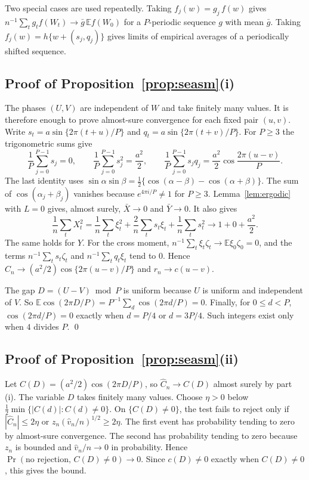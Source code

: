 \documentclass[11pt]{article}
\theoremstyle{remark}
\newcommand{\E}{\mathbb E}
\begin{document}
Two special cases are used repeatedly. Taking $f_j(w)=g_j\,f(w)$ gives $n^{-1}\sum_t g_t f(W_t)\to\bar g\,\E f(W_0)$ for a $P$-periodic sequence $g$ with mean $\bar g$. Taking $f_j(w)=h\{w+(s_j,q_j)\}$ gives limits of empirical averages of a periodically shifted sequence.

\subsection{Proof of Proposition~\ref{prop:seasm}(i)}
The phases $(U,V)$ are independent of $W$ and take finitely many values. It is therefore enough to prove almost-sure convergence for each fixed pair $(u,v)$. Write $s_t=a\sin\{2\pi(t+u)/P\}$ and $q_t=a\sin\{2\pi(t+v)/P\}$. For $P\ge3$ the trigonometric sums give
\[
\frac1P\sum_{j=0}^{P-1}s_j=0,\qquad\frac1P\sum_{j=0}^{P-1}s_j^2=\frac{a^2}2,\qquad\frac1P\sum_{j=0}^{P-1}s_jq_j=\frac{a^2}2\cos\frac{2\pi(u-v)}P.
\]
The last identity uses $\sin\alpha\sin\beta=\tfrac12\{\cos(\alpha-\beta)-\cos(\alpha+\beta)\}$. The sum of $\cos(\alpha_j+\beta_j)$ vanishes because $e^{4\pi i/P}\ne1$ for $P\ge3$. Lemma~\ref{lem:ergodic} with $L=0$ gives, almost surely, $\bar X\to0$ and $\bar Y\to0$. It also gives
\[
\frac1n\sum_tX_t^2=\frac1n\sum_t\xi_t^2+\frac2n\sum_ts_t\xi_t+\frac1n\sum_ts_t^2\to1+0+\frac{a^2}2.
\]
The same holds for $Y$. For the cross moment, $n^{-1}\sum_t\xi_t\zeta_t\to\E\xi_0\zeta_0=0$, and the terms $n^{-1}\sum_ts_t\zeta_t$ and $n^{-1}\sum_tq_t\xi_t$ tend to $0$. Hence $\hat C_n\to(a^2/2)\cos\{2\pi(u-v)/P\}$ and $r_n\to c(u-v)$.

The gap $D=(U-V)\bmod P$ is uniform because $U$ is uniform and independent of $V$. So $\E\cos(2\pi D/P)=P^{-1}\sum_d\cos(2\pi d/P)=0$. Finally, for $0\le d<P$, $\cos(2\pi d/P)=0$ exactly when $d=P/4$ or $d=3P/4$. Such integers exist only when $4$ divides $P$. \qed

\subsection{Proof of Proposition~\ref{prop:seasm}(ii)}
Let $C(D)=(a^2/2)\cos(2\pi D/P)$, so $\hat C_n\to C(D)$ almost surely by part (i). The variable $D$ takes finitely many values. Choose $\eta>0$ below $\tfrac12\min\{|C(d)|:C(d)\ne0\}$. On $\{C(D)\ne0\}$, the test fails to reject only if $|\hat C_n|\le2\eta$ or $z_n(\hat v_n/n)^{1/2}\geq 2\eta$. The first event has probability tending to zero by almost-sure convergence. The second has probability tending to zero because $z_n$ is bounded and $\hat v_n/n\to0$ in probability. Hence $\Pr(\text{no rejection},\,C(D)\ne0)\to0$. Since $c(D)\ne0$ exactly when $C(D)\ne0$, this gives the bound.
\end{document}
